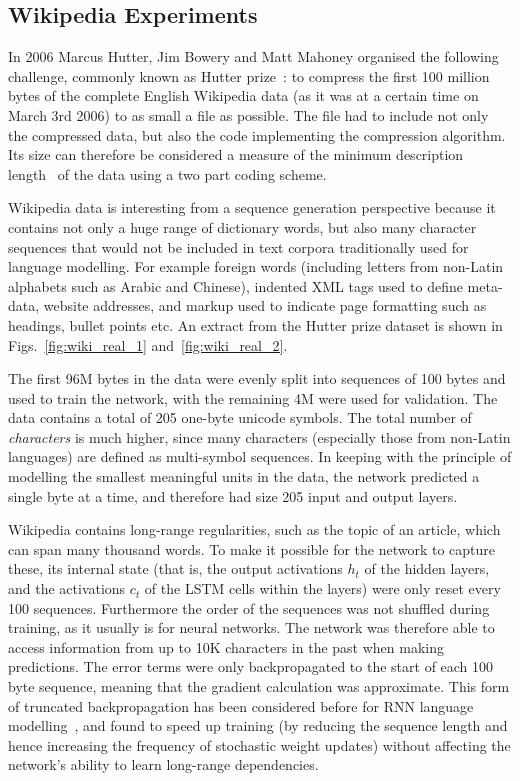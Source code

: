 \documentclass{article}
\begin{document}
\subsection{Wikipedia Experiments}
In 2006 Marcus Hutter, Jim Bowery and Matt Mahoney organised the following challenge, commonly known as Hutter prize~\cite{hutter06prize}: to compress the first 100 million bytes of the complete English Wikipedia data (as it was at a certain time on March 3rd 2006) to as small a file as possible.
The file had to include not only the compressed data, but also the code implementing the compression algorithm.
Its size can therefore be considered a measure of the minimum description length~\cite{grunwald07mdl} of the data using a two part coding scheme.

Wikipedia data is interesting from a sequence generation perspective because it contains not only a huge range of dictionary words, but also many character sequences that would not be included in text corpora traditionally used for language modelling.
For example foreign words (including letters from non-Latin alphabets such as Arabic and Chinese), indented XML tags used to define meta-data, website addresses, and markup used to indicate page formatting such as headings, bullet points etc.
An extract from the Hutter prize dataset is shown in Figs.~\ref{fig:wiki_real_1} and~\ref{fig:wiki_real_2}.

The first 96M bytes in the data were evenly split into sequences of 100 bytes and used to train the network, with the remaining 4M were used for validation.
The data contains a total of 205 one-byte unicode symbols.
The total number of \emph{characters} is much higher, since many characters (especially those from non-Latin languages) are defined as multi-symbol sequences.
In keeping with the principle of modelling the smallest meaningful units in the data, the network predicted a single byte at a time, and therefore had size 205 input and output layers.

Wikipedia contains long-range regularities, such as the topic of an article, which can span many thousand words.
To make it possible for the network to capture these, its internal state (that is, the output activations $h_t$ of the hidden layers, and the activations $c_t$ of the LSTM cells within the layers) were only reset every 100 sequences.
Furthermore the order of the sequences was not shuffled during training, as it usually is for neural networks.
The network was therefore able to access information from up to 10K characters in the past when making predictions.
The error terms were only backpropagated to the start of each 100 byte sequence, meaning that the gradient calculation was approximate.
This form of truncated backpropagation has been considered before for RNN language modelling~\cite{mikolov12thesis}, and found to speed up training (by reducing the sequence length and hence increasing the frequency of stochastic weight updates) without affecting the network's ability to learn long-range dependencies.
\end{document}
